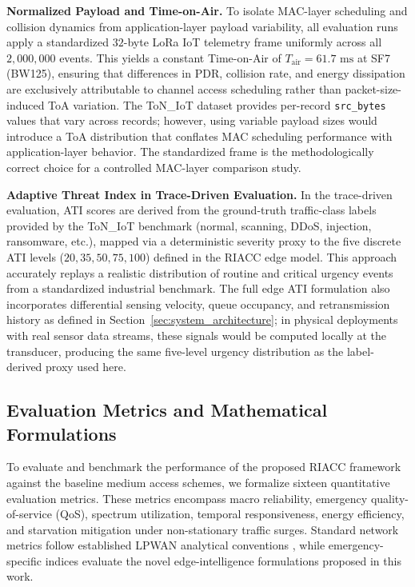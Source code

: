\documentclass[preprint,review,12pt]{elsarticle}
\begin{document}
\textbf{Normalized Payload and Time-on-Air.} To isolate MAC-layer scheduling and collision dynamics from application-layer payload variability, all evaluation runs apply a standardized $32$-byte LoRa IoT telemetry frame uniformly across all $2,000,000$ events. This yields a constant Time-on-Air of $T_{\text{air}} = 61.7\text{ ms}$ at SF7 (BW125), ensuring that differences in PDR, collision rate, and energy dissipation are exclusively attributable to channel access scheduling rather than packet-size-induced ToA variation. The ToN\_IoT dataset provides per-record \texttt{src\_bytes} values that vary across records; however, using variable payload sizes would introduce a ToA distribution that conflates MAC scheduling performance with application-layer behavior. The standardized frame is the methodologically correct choice for a controlled MAC-layer comparison study.

\textbf{Adaptive Threat Index in Trace-Driven Evaluation.} In the trace-driven evaluation, ATI scores are derived from the ground-truth traffic-class labels provided by the ToN\_IoT benchmark (normal, scanning, DDoS, injection, ransomware, etc.), mapped via a deterministic severity proxy to the five discrete ATI levels ($20, 35, 50, 75, 100$) defined in the RIACC edge model. This approach accurately replays a realistic distribution of routine and critical urgency events from a standardized industrial benchmark. The full edge ATI formulation also incorporates differential sensing velocity, queue occupancy, and retransmission history as defined in Section~\ref{sec:system_architecture}; in physical deployments with real sensor data streams, these signals would be computed locally at the transducer, producing the same five-level urgency distribution as the label-derived proxy used here.

\subsection{Evaluation Metrics and Mathematical Formulations}

\label{sec:eval_metrics}

To evaluate and benchmark the performance of the proposed RIACC framework against the baseline medium access schemes, we formalize sixteen quantitative evaluation metrics. These metrics encompass macro reliability, emergency quality-of-service (QoS), spectrum utilization, temporal responsiveness, energy efficiency, and starvation mitigation under non-stationary traffic surges. Standard network metrics follow established LPWAN analytical conventions \cite{adelantado2017understanding,bankov2017mathematical,bouguera2018energy}, while emergency-specific indices evaluate the novel edge-intelligence formulations proposed in this work.
\end{document}
